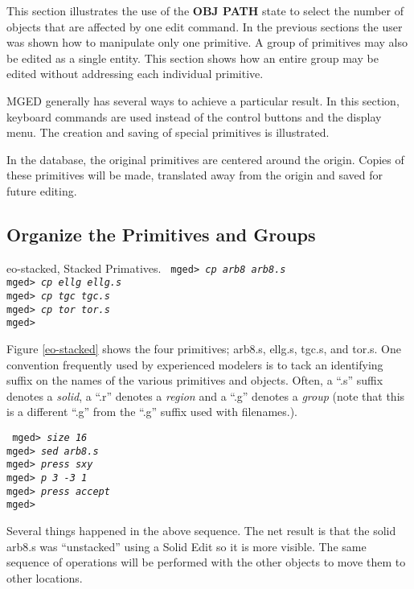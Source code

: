 This section illustrates the use of the {\bf OBJ PATH} state to select the
number of objects that are affected by one edit command.  In the previous
sections the user was shown how to manipulate only one primitive.  A group
of primitives may also be edited as a single entity.  This section
shows how an entire group may be edited without addressing each individual
primitive.

MGED generally has several ways to achieve a particular result.  In 
this section, keyboard commands are used instead of the control buttons and
the display menu.  The creation and saving of special primitives is
illustrated.

In the database, the original primitives are centered around
the origin.  Copies of these primitives will be made, translated away
from the origin and saved for future editing.

\subsection{Organize the Primitives and Groups}

\mfig eo-stacked, Stacked Primatives.
\noindent
{\tt
mged> {\em cp arb8 arb8.s}\\
mged> {\em cp ellg ellg.s}\\
mged> {\em cp tgc tgc.s}\\
mged> {\em cp tor tor.s}\\
mged>\\
}

Figure \ref{eo-stacked} shows the four primitives; arb8.s, ellg.s, tgc.s,
and tor.s.  One convention frequently used by experienced modelers is to
tack an identifying suffix on the names of the various primitives and
objects.  Often, a ``.s'' suffix denotes a {\em solid}, a ``.r'' denotes
a {\em region} and a ``.g'' denotes a {\em group} (note that this is a
different ``.g'' from the ``.g'' suffix used with filenames.).

\noindent
{\tt
mged> {\em size 16}\\
mged> {\em sed arb8.s}\\
mged> {\em press sxy}\\
mged> {\em p 3 -3 1}\\
mged> {\em press accept}\\
mged>\\
}

Several things happened in the above sequence.  The net result is that
the solid arb8.s was ``unstacked'' using a Solid Edit so it is more
visible.  The same sequence of operations will be performed with the
other objects to move them to other locations.


